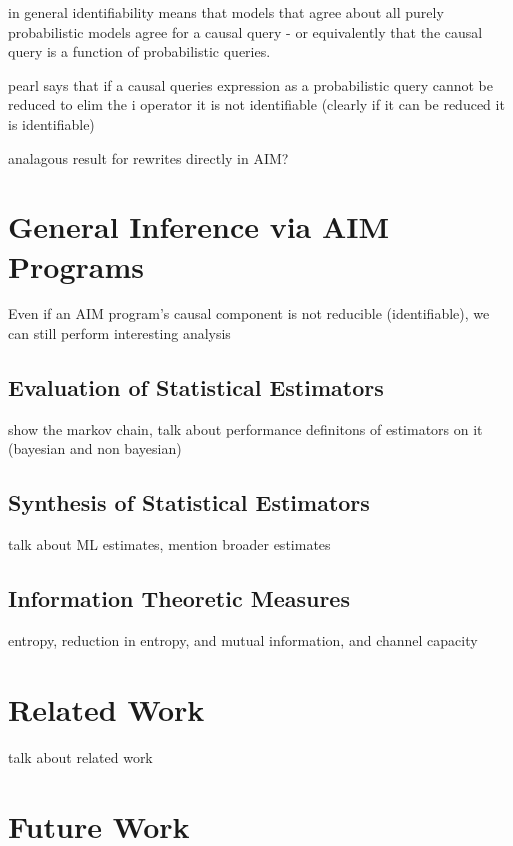 \documentclass{article}
\begin{document}
in general identifiability means that models that agree about all purely probabilistic models agree for a causal query - or equivalently that the causal query is a function of probabilistic queries.

pearl says that if a causal queries expression as a probabilistic query cannot be reduced to elim the i operator it is not identifiable (clearly if it can be reduced it is identifiable)

analagous result for rewrites directly in AIM?

\section{General Inference via AIM Programs}
\label{givap}

Even if an AIM program's causal component is not reducible (identifiable), we can still perform interesting analysis


\subsection{Evaluation of Statistical Estimators}
\label{ese}

show the markov chain, talk about performance definitons of estimators on it (bayesian and non bayesian)

\subsection{Synthesis of Statistical Estimators}
\label{sse}

talk about ML estimates, mention broader estimates

\subsection{Information Theoretic Measures}
\label{itm}

entropy, reduction in entropy, and mutual information, and channel capacity

\section{Related Work}
\label{rw}

talk about related work


\section{Future Work}
\label{fw}
\end{document}
